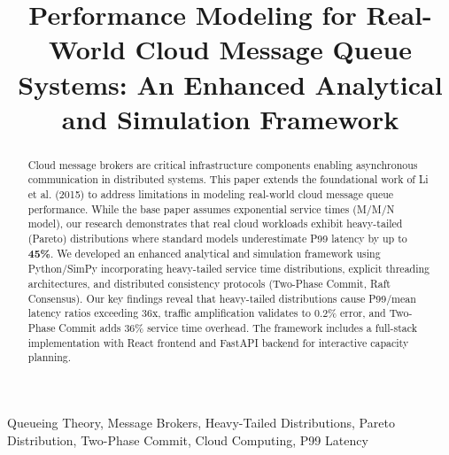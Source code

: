 \documentclass[conference,twocolumn]{IEEEtran}
\begin{document}
\title{Performance Modeling for Real-World Cloud Message Queue Systems: An Enhanced Analytical and Simulation Framework}

\author{
\and
{}
\and
{}
}

\maketitle

\begin{abstract}
Cloud message brokers are critical infrastructure components enabling asynchronous communication in distributed systems. This paper extends the foundational work of Li et al. (2015) to address limitations in modeling real-world cloud message queue performance. While the base paper assumes exponential service times (M/M/N model), our research demonstrates that real cloud workloads exhibit heavy-tailed (Pareto) distributions where standard models underestimate P99 latency by up to \textbf{45\%}. We developed an enhanced analytical and simulation framework using Python/SimPy incorporating heavy-tailed service time distributions, explicit threading architectures, and distributed consistency protocols (Two-Phase Commit, Raft Consensus). Our key findings reveal that heavy-tailed distributions cause P99/mean latency ratios exceeding 36x, traffic amplification validates to 0.2\% error, and Two-Phase Commit adds 36\% service time overhead. The framework includes a full-stack implementation with React frontend and FastAPI backend for interactive capacity planning.
\end{abstract}

\begin{IEEEkeywords}
Queueing Theory, Message Brokers, Heavy-Tailed Distributions, Pareto Distribution, Two-Phase Commit, Cloud Computing, P99 Latency
\end{IEEEkeywords}
\end{document}
